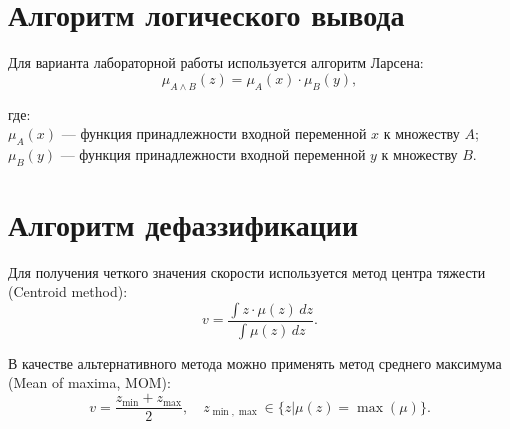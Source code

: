 \section{Алгоритм логического вывода}

Для варианта лабораторной работы используется алгоритм Ларсена:
\begin{equation*}
    \mu_{A \wedge B}(z) = \mu_A(x) \cdot \mu_B(y),
\end{equation*}

где:\\
$\mu_A(x)$ — функция принадлежности входной переменной $x$ к множеству $A$;\\
$\mu_B(y)$ — функция принадлежности входной переменной $y$ к множеству $B$.

\section{Алгоритм дефаззификации}

Для получения четкого значения скорости используется метод центра тяжести (Centroid method):
\[
v = \frac{\int z \cdot \mu(z) \, dz}{\int \mu(z) \, dz}.
\]

В качестве альтернативного метода можно применять метод среднего максимума (Mean of maxima, MOM):
\[
v = \frac{z_{\min} + z_{\max}}{2}, \quad z_{\min,\max} \in \{z | \mu(z) = \max(\mu)\}.
\]